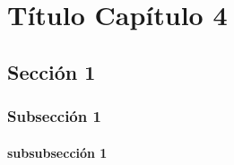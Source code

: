 \chapter{Título Capítulo 4}

\lipsum[5]

\section{Sección 1}

\lipsum[6]

\subsection{Subsección 1}

\lipsum[7]

\subsubsection{subsubsección 1}

\lipsum[8]
